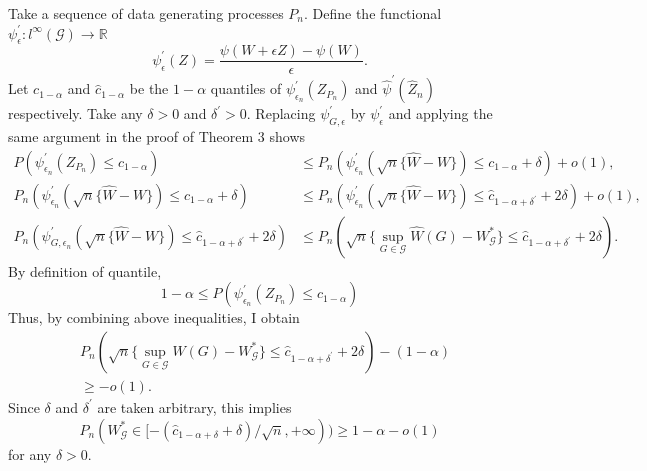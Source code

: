 \documentclass[12pt,oneside,reqno,english]{amsart}
\theoremstyle{definition}
\begin{document}
Take a sequence of data generating processes $P_{n}$. 
Define the functional $\psi^{\prime}_{\epsilon}:l^{\infty}(\mathcal{G})\rightarrow \mathbb{R}$ 
\[\psi^{\prime}_{\epsilon}(Z)=\frac{\psi(W+\epsilon Z)-\psi(W)}{\epsilon}.\]
Let $c_{1-\alpha}$ and $\hat{c}_{1-\alpha}$ be 
the $1-\alpha$ quantiles of $\psi^{\prime}_{\epsilon_{n}}(Z_{P_{n}})$ and $\hat{\psi}^{\prime}(\hat{Z}_{n})$ respectively.
Take any $\delta>0$ and $\delta^{\prime}>0$.
Replacing $\psi^{\prime}_{G,\epsilon}$ by $\psi^{\prime}_{\epsilon}$ and applying the same argument in the proof of Theorem 3 shows 
\begin{align*}
P(\psi^{\prime}_{\epsilon_{n}}(Z_{P_{n}})\leq c_{1-\alpha})&\leq P_{n}( \psi^{\prime}_{\epsilon_{n}}(\sqrt{n}\{\hat{W}-W\}) \leq c_{1-\alpha}+\delta)+o(1),\\
P_{n}( \psi^{\prime}_{\epsilon_{n}}(\sqrt{n}\{\hat{W}-W\}) \leq c_{1-\alpha}+\delta)&\leq 
P_{n}( \psi^{\prime}_{\epsilon_{n}}(\sqrt{n}\{\hat{W}-W\}) \leq \hat{c}_{1-\alpha+\delta^{\prime}}+2\delta)+o(1),\\
P_{n}( \psi^{\prime}_{G,\epsilon_{n}}(\sqrt{n}\{\hat{W}-W\}) \leq \hat{c}_{1-\alpha+\delta^{\prime}}+2\delta)&\leq 
P_{n}(\sqrt{n}\{\sup_{G\in \mathcal{G}}\hat{W}(G)-W^{*}_{\mathcal{G}}\}\leq \hat{c}_{1-\alpha+\delta^{\prime}}+2\delta).
\end{align*}
By definition of quantile,
\[1-\alpha \leq P(\psi^{\prime}_{\epsilon_{n}}(Z_{P_{n}})\leq c_{1-\alpha})\]
Thus, by combining above inequalities, I obtain 
\begin{align*}
&P_{n}(\sqrt{n}\{\sup_{G\in \mathcal{G}}W(G)-W^{*}_{\mathcal{G}}\}\leq \hat{c}_{1-\alpha+\delta^{\prime}}+2\delta)-(1-\alpha)\\
&\geq -o(1).
\end{align*}
Since $\delta$ and $\delta^{\prime}$ are taken arbitrary, 
this implies 
\[P_{n}(W^{*}_{\mathcal{G}}\in [-(\hat{c}_{1-\alpha+\delta}+\delta)/\sqrt{n}, +\infty ) )\geq 1-\alpha-o(1)\]
for any $\delta>0$. 



\newpage{} 
\end{document}
